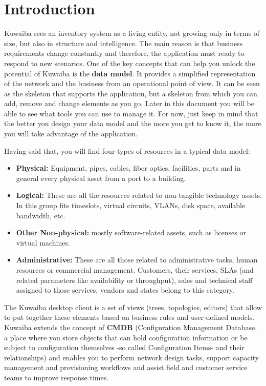 \documentclass[a4paper]{article}
\begin{document}
	\section{Introduction}
	Kuwaiba sees an inventory system as a living entity, not growing only in terms of size, but also in structure and intelligence. The main reason is that business requirements change constantly and therefore, the application must ready to respond to new scenarios. One of the key concepts that can help you unlock the potential of Kuwaiba is the \textbf{data model}. It provides a simplified representation of the network and the business from an operational point of view. It can be seen as the skeleton that supports the application, but a skeleton from which you can add, remove and change elements as you go. Later in this document you will be able to see what tools you can use to manage it. For now, just keep in mind that the better you design your data model and the more you get to know it, the more you will take advantage of the application.\newline
	
	Having said that, you will find four types of resources in a typical data model:
	\begin{itemize}
		\item \textbf{Physical:} Equipment, pipes, cables, fiber optics, facilities, parts and in general every physical asset from a port to a building. 
		\item \textbf{Logical:} These are all the resources related to non-tangible technology assets. In this group fits timeslots, virtual circuits, VLANs, disk space, available bandwidth, etc.
		\item \textbf{Other Non-physical:} mostly software-related assets, such as licenses or virtual machines.
		\item \textbf{Administrative:} These are all those related to administrative tasks, human resources or commercial management. Customers, their services, SLAs (and related parameters like availability or throughput), sales and technical staff assigned to those services, vendors and states belong to this category.
	\end{itemize}
	The Kuwaiba desktop client is a set of views (trees, topologies, editors) that allow to put together these elements based on business rules and  user-defined models. Kuwaiba extends the concept of \textbf{CMDB} (Configuration Management Database, a place where you store objects that can hold configuration information or be subject to configuration themselves -so called Configuration Items- and their relationships)  and enables you to perform network design tasks, support capacity management and provisioning workflows and assist field and customer service teams to improve response times.\newline
	
\end{document}
